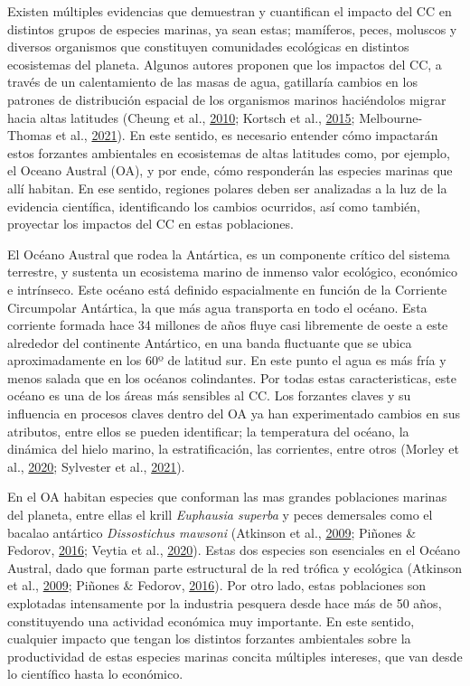 \documentclass[
]{article}
\begin{document}
Existen múltiples evidencias que demuestran y cuantifican el impacto del
CC en distintos grupos de especies marinas, ya sean estas; mamíferos,
peces, moluscos y diversos organismos que constituyen comunidades
ecológicas en distintos ecosistemas del planeta. Algunos autores
proponen que los impactos del CC, a través de un calentamiento de las
masas de agua, gatillaría cambios en los patrones de distribución
espacial de los organismos marinos haciéndolos migrar hacia altas
latitudes (Cheung et al., \protect\hyperlink{ref-Cheung2010a}{2010};
Kortsch et al., \protect\hyperlink{ref-Kortsch2015}{2015};
Melbourne-Thomas et al.,
\protect\hyperlink{ref-Melbourne-Thomas2021}{2021}). En este sentido, es
necesario entender cómo impactarán estos forzantes ambientales en
ecosistemas de altas latitudes como, por ejemplo, el Oceano Austral
(OA), y por ende, cómo responderán las especies marinas que allí
habitan. En ese sentido, regiones polares deben ser analizadas a la luz
de la evidencia científica, identificando los cambios ocurridos, así
como también, proyectar los impactos del CC en estas poblaciones.

El Océano Austral que rodea la Antártica, es un componente crítico del
sistema terrestre, y sustenta un ecosistema marino de inmenso valor
ecológico, económico e intrínseco. Este océano está definido
espacialmente en función de la Corriente Circumpolar Antártica, la que
más agua transporta en todo el océano. Esta corriente formada hace 34
millones de años fluye casi libremente de oeste a este alrededor del
continente Antártico, en una banda fluctuante que se ubica
aproximadamente en los 60º de latitud sur. En este punto el agua es más
fría y menos salada que en los océanos colindantes. Por todas estas
caracteristicas, este océano es una de los áreas más sensibles al CC.
Los forzantes claves y su influencia en procesos claves dentro del OA ya
han experimentado cambios en sus atributos, entre ellos se pueden
identificar; la temperatura del océano, la dinámica del hielo marino, la
estratificación, las corrientes, entre otros (Morley et al.,
\protect\hyperlink{ref-Morley2020}{2020}; Sylvester et al.,
\protect\hyperlink{ref-Sylvester2021}{2021}).

En el OA habitan especies que conforman las mas grandes poblaciones
marinas del planeta, entre ellas el krill \emph{Euphausia superba} y
peces demersales como el bacalao antártico \emph{Dissostichus mawsoni}
(Atkinson et al., \protect\hyperlink{ref-Atkinson2009}{2009}; Piñones \&
Fedorov, \protect\hyperlink{ref-Pinones2016}{2016}; Veytia et al.,
\protect\hyperlink{ref-Veytia2020}{2020}). Estas dos especies son
esenciales en el Océano Austral, dado que forman parte estructural de la
red trófica y ecológica (Atkinson et al.,
\protect\hyperlink{ref-Atkinson2009}{2009}; Piñones \& Fedorov,
\protect\hyperlink{ref-Pinones2016}{2016}). Por otro lado, estas
poblaciones son explotadas intensamente por la industria pesquera desde
hace más de 50 años, constituyendo una actividad económica muy
importante. En este sentido, cualquier impacto que tengan los distintos
forzantes ambientales sobre la productividad de estas especies marinas
concita múltiples intereses, que van desde lo científico hasta lo
económico.
\end{document}
